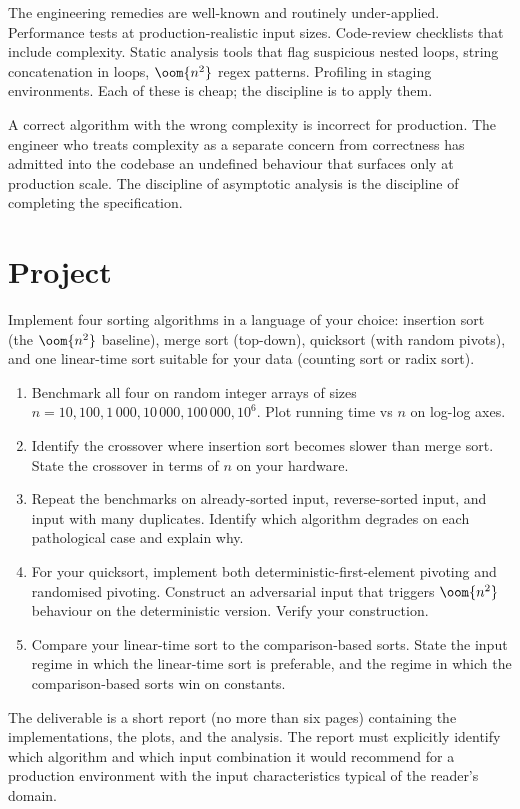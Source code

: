 The engineering remedies are well-known and routinely under-applied. Performance tests at production-realistic input sizes. Code-review checklists that include complexity. Static analysis tools that flag suspicious nested loops, string concatenation in loops, $\oom{n^2}$ regex patterns. Profiling in staging environments. Each of these is cheap; the discipline is to apply them.

\begin{principle}
A correct algorithm with the wrong complexity is incorrect for production. The engineer who treats complexity as a separate concern from correctness has admitted into the codebase an undefined behaviour that surfaces only at production scale. The discipline of asymptotic analysis is the discipline of completing the specification.
\end{principle}

\section{Project}

\begin{project}
Implement four sorting algorithms in a language of your choice: insertion sort (the $\oom{n^2}$ baseline), merge sort (top-down), quicksort (with random pivots), and one linear-time sort suitable for your data (counting sort or radix sort).

\begin{enumerate}[leftmargin=*]
  \item Benchmark all four on random integer arrays of sizes $n = 10, 100, 1\,000, 10\,000, 100\,000, 10^6$. Plot running time vs $n$ on log-log axes.
  \item Identify the crossover where insertion sort becomes slower than merge sort. State the crossover in terms of $n$ on your hardware.
  \item Repeat the benchmarks on already-sorted input, reverse-sorted input, and input with many duplicates. Identify which algorithm degrades on each pathological case and explain why.
  \item For your quicksort, implement both deterministic-first-element pivoting and randomised pivoting. Construct an adversarial input that triggers $\oom{n^2}$ behaviour on the deterministic version. Verify your construction.
  \item Compare your linear-time sort to the comparison-based sorts. State the input regime in which the linear-time sort is preferable, and the regime in which the comparison-based sorts win on constants.
\end{enumerate}

The deliverable is a short report (no more than six pages) containing the implementations, the plots, and the analysis. The report must explicitly identify which algorithm and which input combination it would recommend for a production environment with the input characteristics typical of the reader's domain.
\end{project}

